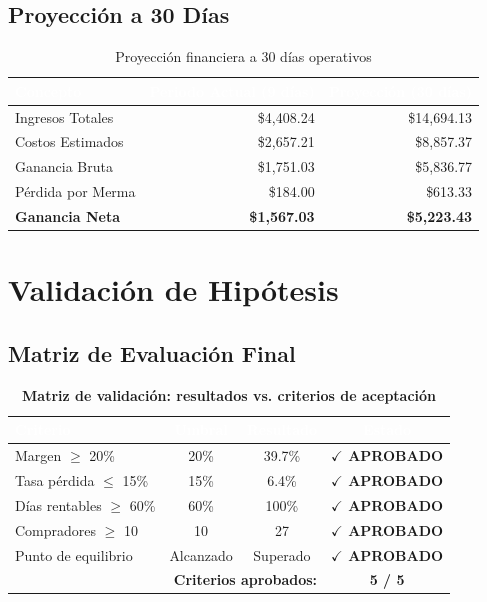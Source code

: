 \documentclass[12pt, a4paper]{article}
\begin{document}
\subsection{Proyección a 30 Días}

\begin{table}[H]
\centering
\caption{Proyección financiera a 30 días operativos}
\begin{tabular}{l r r}
\toprule
\rowcolor{tableheader}
\textcolor{white}{\textbf{Concepto}} & \textcolor{white}{\textbf{Periodo Actual (9 días)}} & \textcolor{white}{\textbf{Proyección (30 días)}} \\
\midrule
Ingresos Totales & \$4,408.24 & \$14,694.13 \\
\rowcolor{rowalt}
Costos Estimados & \$2,657.21 & \$8,857.37 \\
Ganancia Bruta & \$1,751.03 & \$5,836.77 \\
\rowcolor{rowalt}
Pérdida por Merma & \$184.00 & \$613.33 \\
\textbf{Ganancia Neta} & \textbf{\$1,567.03} & \textbf{\$5,223.43} \\
\bottomrule
\end{tabular}
\end{table}

\section{Validación de Hipótesis}

\subsection{Matriz de Evaluación Final}

\begin{table}[H]
\centering
\caption{\textbf{Matriz de validación: resultados vs. criterios de aceptación}}
\begin{tabular}{l c c c}
\toprule
\rowcolor{tableheader}
\textcolor{white}{\textbf{Criterio}} & \textcolor{white}{\textbf{Umbral}} & \textcolor{white}{\textbf{Resultado}} & \textcolor{white}{\textbf{Estado}} \\
\midrule
Margen $\geq$ 20\% & 20\% & 39.7\% & \textcolor{successgreen}{\textbf{$\checkmark$ APROBADO}} \\
\rowcolor{rowalt}
Tasa pérdida $\leq$ 15\% & 15\% & 6.4\% & \textcolor{successgreen}{\textbf{$\checkmark$ APROBADO}} \\
Días rentables $\geq$ 60\% & 60\% & 100\% & \textcolor{successgreen}{\textbf{$\checkmark$ APROBADO}} \\
\rowcolor{rowalt}
Compradores $\geq$ 10 & 10 & 27 & \textcolor{successgreen}{\textbf{$\checkmark$ APROBADO}} \\
Punto de equilibrio & Alcanzado & Superado & \textcolor{successgreen}{\textbf{$\checkmark$ APROBADO}} \\
\midrule
\multicolumn{3}{r}{\textbf{Criterios aprobados:}} & \textbf{5 / 5} \\
\bottomrule
\end{tabular}
\end{table}
\end{document}
